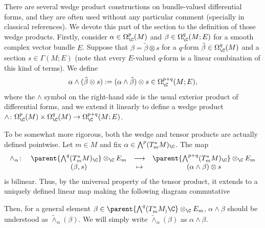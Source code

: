 There are several wedge product constructions on bundle-valued differential forms, and they are often used without any particular comment (specially in classical references). We devote this part of the section to the definition of those wedge products. Firstly, consider \(\alpha \in \Omega_\C^p(M)\) and \(\beta\in \Omega_\C^q(M; E)\) for a smooth complex vector bundle \(E\). Suppose that \(\beta=\tilde{\beta} \otimes s\) for a \(q\)-form \(\tilde{\beta} \in \Omega_\C^q(M)\) and a section \(s \in \Gamma(M;E)\) (note that every \(E\)-valued \(q\)-form is a linear combination of this kind of terms). We define 
\[
\alpha \wedge (\tilde{\beta} \otimes s):=(\alpha \wedge \tilde{\beta}) \otimes s \in \Omega_\C^{p+q}(M;E),
\]
where the \(\wedge\) symbol on the right-hand side is the usual exterior product of differential forms, and we extend it linearly to define a wedge product \(\wedge \colon \Omega_\C^p(M) \times \Omega_\C^q(M) \to \Omega_\C^{p+q}(M;E)\).

\begin{obs} \label{obs_wedge_bundle}
    To be somewhat more rigorous, both the wedge and tensor products are actually defined pointwise. Let \(m \in M\) and fix \(\alpha \in \bigwedge^p (T_m^*M)_\C\). The map 
    \[
    \begin{array}{cccc}
      \wedge_\alpha\colon &   \parent{\bigwedge^q (T_m^*M)_\C} \otimes_\C E_m & \longrightarrow & \parent{\bigwedge^{p+q} (T_m^*M)_\C} \otimes _\C E_m \\
       & (\beta, s) & \mapsto & (\alpha \wedge \beta) \otimes s 
    \end{array}
    \]
    is bilinear. Thus, by the universal property of the tensor product, it extends to a uniquely defined linear map making the following diagram commutative
    \begin{center}
    \end{center}
    Then, for a general element \(\beta\in \parent{\bigwedge^q (T^*_mM_)\C} \otimes_\C E_m\), \(\alpha \wedge \beta\) should be understood as \(\tilde{\wedge}_\alpha (\beta)\). We will simply write \(\tilde{\wedge}_\alpha(\beta)\) as \(\alpha \wedge \beta\).
\end{obs}

